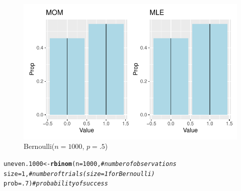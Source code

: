 \documentclass{article}\usepackage[]{graphicx}\usepackage[]{color}
\makeatletter
\def\maxwidth{ %
  \ifdim\Gin@nat@width>\linewidth
    \linewidth
  \else
    \Gin@nat@width
  \fi
}
\newcommand{\hlnum}[1]{\textcolor[rgb]{0.686,0.059,0.569}{#1}}%
\newcommand{\hlcom}[1]{\textcolor[rgb]{0.678,0.584,0.686}{\textit{#1}}}%
\newcommand{\hlstd}[1]{\textcolor[rgb]{0.345,0.345,0.345}{#1}}%
\newcommand{\hlkwb}[1]{\textcolor[rgb]{0.69,0.353,0.396}{#1}}%
\newcommand{\hlkwc}[1]{\textcolor[rgb]{0.333,0.667,0.333}{#1}}%
\newcommand{\hlkwd}[1]{\textcolor[rgb]{0.737,0.353,0.396}{\textbf{#1}}}%
\newenvironment{kframe}{%
 \def\at@end@of@kframe{}%
 \ifinner\ifhmode%
  \def\at@end@of@kframe{\end{minipage}}%
  \begin{minipage}{\columnwidth}%
 \fi\fi%
 \def\FrameCommand##1{\hskip\@totalleftmargin \hskip-\fboxsep
 \colorbox{shadecolor}{##1}\hskip-\fboxsep
     \hskip-\linewidth \hskip-\@totalleftmargin \hskip\columnwidth}%
 \MakeFramed {\advance\hsize-\width
   \@totalleftmargin\z@ \linewidth\hsize
   \@setminipage}}%
 {\par\unskip\endMakeFramed%
 \at@end@of@kframe}
\newenvironment{knitrout}{}{} %
\makeatother
\begin{document}
\begin{enumerate}
\begin{enumerate}
\begin{figure}[H]
\begin{center}
\begin{knitrout}
\color{fgcolor}
\includegraphics[width=\maxwidth]{figure/unnamed-chunk-61-1} 
\end{knitrout}
\caption{Bernoulli($n=1000$, $p=.5$)}
\label{p4plot7}%
\end{center}
\end{figure}


\begin{knitrout}
\color{fgcolor}\begin{kframe}
\begin{alltt}
\hlstd{uneven.1000} \hlkwb{<-} \hlkwd{rbinom}\hlstd{(}\hlkwc{n}\hlstd{=}\hlnum{1000}\hlstd{,}        \hlcom{#number of observations}
                    \hlkwc{size}\hlstd{=}\hlnum{1}\hlstd{,}        \hlcom{#number of trials (size=1 for Bernoulli)}
                    \hlkwc{prob}\hlstd{=}\hlnum{.7}\hlstd{)}       \hlcom{#probability of success}


\end{alltt}
\end{kframe}
\end{knitrout}
\end{enumerate}
\end{enumerate}
\end{document}

